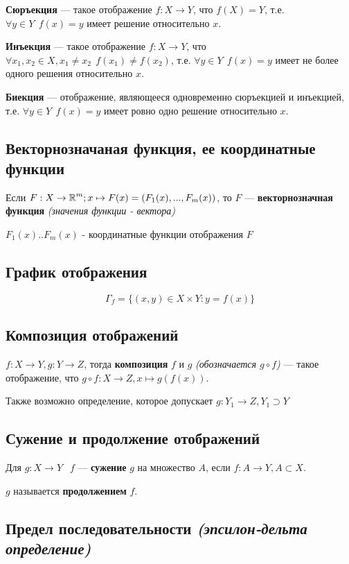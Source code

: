\textbf{Сюръекция} --- такое отображение $f: X\to Y$, что $f(X)=Y$, т.е. $\forall y\in Y \ \ f(x)=y$ имеет решение относительно $x$.


\textbf{Инъекция} --- такое отображение $f: X\to Y$, что $\forall x_1, x_2 \in X, x_1\not=x_2 \ \ f(x_1)\not=f(x_2)$, т.е. $\forall y\in Y \ \ f(x)=y$ имеет не более одного решения относительно $x$.


\textbf{Биекция} --- отображение, являющееся одновременно сюръекцией и инъекцией, т.е. $\forall y\in Y \ \ f(x)=y$ имеет ровно одно решение относительно $x$.

\subsection{Векторнозначаная функция, ее координатные функции}

Если $F:X\to \operatorname*{\mathbb{R}}^m; x\mapsto F(x) = (F_1(x), ..., F_m(x))$, то $F$ --- \textbf{векторнозначная функция} \textit{(значения функции - вектора)}


$F_1(x)..F_m(x)$ - координатные функции отображения $F$

\subsection{График отображения}

$$\Gamma_f = \{(x,y)\in X\times Y: y = f(x) \}$$

\subsection{Композиция отображений}

$f: X\to Y, g: Y\to Z$, тогда \textbf{композиция} $f$ и $g$ \textit{(обозначается $g\circ f$)} --- такое отображение, что $g\circ f: X\to Z, x\mapsto g(f(x))$.


Также возможно определение, которое допускает $g: Y_1\to Z, Y_1\supset Y$

\subsection{Сужение и продолжение отображений}

Для $g: X\to Y\ \ $ $f$ --- \textbf{сужение} $g$ на множество $A$, если $f: A\to Y, A\subset X$.


$g$ называется \textbf{продолжением} $f$.

\subsection{Предел последовательности \textit{(эпсилон-дельта определение)}}

